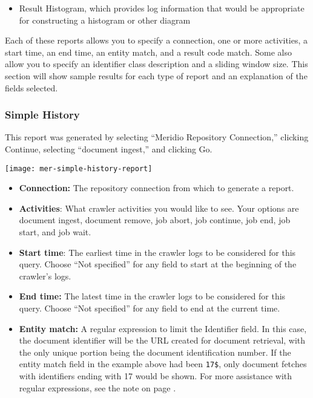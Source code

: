 \begin{changemargin}{1.5in}{0in}
\begin{itemize}
\item Result Histogram, which provides log information that would be
appropriate for constructing a histogram or other diagram

\end{itemize}

Each of these reports allows you to specify a connection, one or more
activities, a start time, an end time, an entity match, and a result code
match.  Some also allow you to specify an identifier class description
and a sliding window size. This section will show sample results for
each type of report and an explanation of the fields selected.

\subsubsection{Simple History}

This report was generated by selecting ``Meridio Repository Connection,'' 
clicking Continue, selecting ``document ingest,'' and clicking Go.

\texttt{[image: mer-simple-history-report]}

\begin{itemize}

\item \textbf{Connection:} The repository connection from which to generate
a report.

\item \textbf{Activities}: What crawler activities you would like to
see.  Your options are document ingest, document remove, job
abort, job continue, job end, job start, and job wait.

\item \textbf{Start time}: The earliest time in the crawler logs to be
considered for this query.  Choose ``Not specified'' for any field to
start at the beginning of the crawler's logs.

\item \textbf{End time:} The latest time in the crawler logs to be
considered for this query. Choose ``Not specified'' for any field 
to end at the current time.

\item \textbf{Entity match:} A regular expression to limit the
Identifier field. In this case, the document identifier will be the
URL created for document retrieval, with the only unique portion being
the document identification number.
If the entity match field in the example above had
been \texttt{17\$}, only document fetches with identifiers ending
with 17 would be shown. For more assistance with regular expressions, see the note on page \pageref{regex}.


\end{itemize}
\end{changemargin}
